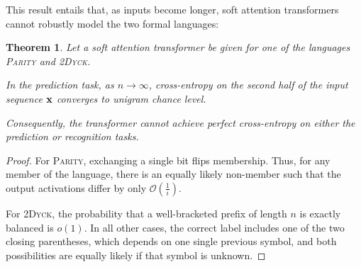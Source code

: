 \documentclass[11pt,a4paper]{article}
\newcounter{theorem}
\newtheorem{thm}[theorem]{Theorem}
\begin{document}
This result entails that, as inputs become longer, soft attention transformers cannot robustly model the two formal languages:

\begin{thm}
Let a soft attention transformer be given for one of the languages \textsc{Parity} and \textsc{2Dyck}. %

In the prediction task, as $n\rightarrow\infty$, cross-entropy on the second half of the input sequence ${\bf x}$ converges to unigram chance level.

Consequently, the transformer cannot achieve perfect cross-entropy on either the prediction or recognition tasks.
\end{thm}

\begin{proof}
For \textsc{Parity}, exchanging a single bit flips membership.
Thus, for any member of the language, there is an equally likely non-member such that the output activations differ by
only $\mathcal{O}(\frac{1}{i})$.

For \textsc{2Dyck}, the probability that a well-bracketed prefix of length $n$ is exactly balanced is $o(1)$.
In all other cases, the correct label includes one of the two closing parentheses, which depends on one single previous symbol, and both possibilities are equally likely if that symbol is unknown.
\end{proof}
\end{document}
